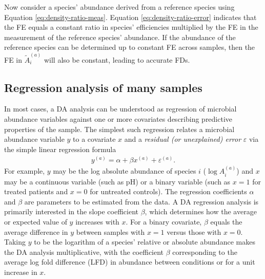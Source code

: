 \documentclass[
]{article}
\begin{document}
Now consider a species' abundance derived from a reference species using Equation \eqref{eq:density-ratio-meas}.
Equation \eqref{eq:density-ratio-error} indicates that the FE equals a constant ratio in species' efficiencies multiplied by the FE in the measurement of the reference species' abundance.
If the abundance of the reference species can be determined up to constant FE across samples, then the FE in \(\tilde A_i^{(a)}\) will also be constant, leading to accurate FDs.

\hypertarget{regression-analysis-of-many-samples}{%
\subsection{Regression analysis of many samples}\label{regression-analysis-of-many-samples}}

In most cases, a DA analysis can be understood as regression of microbial abundance variables against one or more covariates describing predictive properties of the sample.
The simplest such regression relates a microbial abundance variable \(y\) to a covariate \(x\) and a \emph{residual (or unexplained) error} \(\varepsilon\) via the simple linear regression formula
\begin{align}
  \label{eq:regression}
  y^{(a)} = \alpha + \beta x^{(a)} + \varepsilon^{(a)}.
\end{align}
For example, \(y\) may be the log absolute abundance of species \(i\) (\(\log A_i^{(a)}\)) and \(x\) may be a continuous variable (such as pH) or a binary variable (such as \(x=1\) for treated patients and \(x=0\) for untreated controls).
The regression coefficients \(\alpha\) and \(\beta\) are parameters to be estimated from the data.
A DA regression analysis is primarily interested in the slope coefficient \(\beta\), which determines how the average or expected value of \(y\) increases with \(x\).
For a binary covariate, \(\beta\) equals the average difference in \(y\) between samples with \(x=1\) versus those with \(x=0\).
Taking \(y\) to be the logarithm of a species' relative or absolute abundance makes the DA analysis multiplicative, with the coefficient \(\beta\) corresponding to the average log fold difference (LFD) in abundance between conditions or for a unit increase in \(x\).
\end{document}

